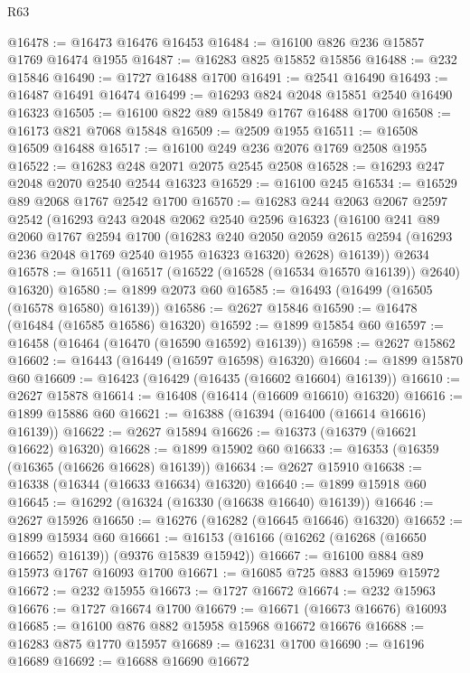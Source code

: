 \begin{lexlean}{R63}
\begin{coremodule}
@16478 := @16473 @16476 @16453
@16484 := @16100 @826 @236 @15857 @1769 @16474 @1955
@16487 := @16283 @825 @15852 @15856
@16488 := @232 @15846
@16490 := @1727 @16488 @1700
@16491 := @2541 @16490
@16493 := @16487 @16491 @16474
@16499 := @16293 @824 @2048 @15851 @2540 @16490 @16323
@16505 := @16100 @822 @89 @15849 @1767 @16488 @1700
@16508 := @16173 @821 @7068 @15848
@16509 := @2509 @1955
@16511 := @16508 @16509 @16488
@16517 := @16100 @249 @236 @2076 @1769 @2508 @1955
@16522 := @16283 @248 @2071 @2075 @2545 @2508
@16528 := @16293 @247 @2048 @2070 @2540 @2544 @16323
@16529 := @16100 @245
@16534 := @16529 @89 @2068 @1767 @2542 @1700
@16570 := @16283
    @244
    @2063
    @2067
    @2597
    @2542
    (@16293
      @243
      @2048
      @2062
      @2540
      @2596
      @16323
      (@16100
        @241
        @89
        @2060
        @1767
        @2594
        @1700
        (@16283
          @240
          @2050
          @2059
          @2615
          @2594
          (@16293 @236 @2048 @1769 @2540 @1955 @16323 @16320)
          @2628)
        @16139))
    @2634
@16578 := @16511 (@16517 (@16522 (@16528 (@16534 @16570 @16139)) @2640) @16320)
@16580 := @1899 @2073 @60
@16585 := @16493 (@16499 (@16505 (@16578 @16580) @16139))
@16586 := @2627 @15846
@16590 := @16478 (@16484 (@16585 @16586) @16320)
@16592 := @1899 @15854 @60
@16597 := @16458 (@16464 (@16470 (@16590 @16592) @16139))
@16598 := @2627 @15862
@16602 := @16443 (@16449 (@16597 @16598) @16320)
@16604 := @1899 @15870 @60
@16609 := @16423 (@16429 (@16435 (@16602 @16604) @16139))
@16610 := @2627 @15878
@16614 := @16408 (@16414 (@16609 @16610) @16320)
@16616 := @1899 @15886 @60
@16621 := @16388 (@16394 (@16400 (@16614 @16616) @16139))
@16622 := @2627 @15894
@16626 := @16373 (@16379 (@16621 @16622) @16320)
@16628 := @1899 @15902 @60
@16633 := @16353 (@16359 (@16365 (@16626 @16628) @16139))
@16634 := @2627 @15910
@16638 := @16338 (@16344 (@16633 @16634) @16320)
@16640 := @1899 @15918 @60
@16645 := @16292 (@16324 (@16330 (@16638 @16640) @16139))
@16646 := @2627 @15926
@16650 := @16276 (@16282 (@16645 @16646) @16320)
@16652 := @1899 @15934 @60
@16661 := @16153 (@16166 (@16262 (@16268 (@16650 @16652) @16139)) (@9376 @15839 @15942))
@16667 := @16100 @884 @89 @15973 @1767 @16093 @1700
@16671 := @16085 @725 @883 @15969 @15972
@16672 := @232 @15955
@16673 := @1727 @16672
@16674 := @232 @15963
@16676 := @1727 @16674 @1700
@16679 := @16671 (@16673 @16676) @16093
@16685 := @16100 @876 @882 @15958 @15968 @16672 @16676
@16688 := @16283 @875 @1770 @15957
@16689 := @16231 @1700
@16690 := @16196 @16689
@16692 := @16688 @16690 @16672

\end{coremodule}
\end{lexlean}
